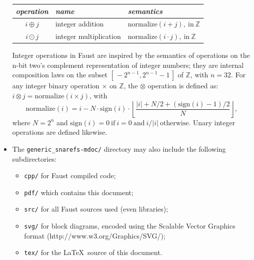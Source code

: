 \documentclass{article}
\newcommand{\faustdocdir}{generic_snarefs-mdoc}
\begin{document}
\begin{itemize}
\begin{center}
\begin{tabular}{|c|l|l|}
		\hline 
		\emph{operation} & \emph{name} & \emph{semantics} \\
		\hline 
		$i \oplus j$ & integer addition & $\mathrm{normalize}(i+j), \mathrm{~in~} \mathbb{Z}$ \\
		$i \odot j$ & integer multiplication & $\mathrm{normalize}(i \cdot j), \mathrm{~in~} \mathbb{Z}$ \\
		\hline 
	\end{tabular} 
	\end{center}
		Integer operations in Faust are inspired by the semantics of operations on the n-bit two's complement representation of integer numbers; they are internal composition laws on the subset $[\,-2^{n-1}, 2^{n-1}\!-\!1\,]$ of $\mathbb{Z}$, with $n = 32$. For any integer binary operation $\times$ on $\mathbb{Z}$, the $\otimes$ operation is defined as: $i \otimes j = \mathrm{normalize}(i \times j)$, with 
$$\mathrm{normalize}(i) = i - N\cdot\mathrm{sign}(i) \cdot \left\lfloor \frac{|i|+N/2+(\mathrm{sign}(i)\!-\!1)/2}{N} \right\rfloor , $$
 where $N = 2^n$ and $\mathrm{sign}(i) = 0 \mathrm{\ if\ } i=0 \mathrm{\ and\ } i / |i| \mathrm{\ otherwise}.$
Unary integer operations are defined likewise.
	\item The \texttt{\faustdocdir/} directory may also include the following subdirectories:
\begin{itemize}
	\item	\texttt{cpp/} for Faust compiled code; 
	\item	\texttt{pdf/} which contains this document; 
	\item	\texttt{src/} for all Faust sources used (even libraries); 
	\item	\texttt{svg/} for block diagrams, encoded using the Scalable Vector Graphics format (\textsf{http://www.w3.org/Graphics/SVG/});
	\item	\texttt{tex/} for the \LaTeX\ source of this document.
\end{itemize}
\end{itemize}
\end{document}
